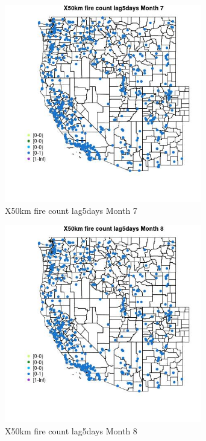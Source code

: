 \begin{figure} 
\centering  
\includegraphics[width=0.77\textwidth]{Code_Outputs/Report_ML_input_PM25_Step4_part_e_de_duplicated_aves_compiled_2019-05-14wNAs_MapObsMo7X50km_fire_count_lag5days.jpg} 
\caption{\label{fig:Report_ML_input_PM25_Step4_part_e_de_duplicated_aves_compiled_2019-05-14wNAsMapObsMo7X50km_fire_count_lag5days}X50km fire count lag5days Month 7} 
\end{figure} 
 

\begin{figure} 
\centering  
\includegraphics[width=0.77\textwidth]{Code_Outputs/Report_ML_input_PM25_Step4_part_e_de_duplicated_aves_compiled_2019-05-14wNAs_MapObsMo8X50km_fire_count_lag5days.jpg} 
\caption{\label{fig:Report_ML_input_PM25_Step4_part_e_de_duplicated_aves_compiled_2019-05-14wNAsMapObsMo8X50km_fire_count_lag5days}X50km fire count lag5days Month 8} 
\end{figure} 
 

